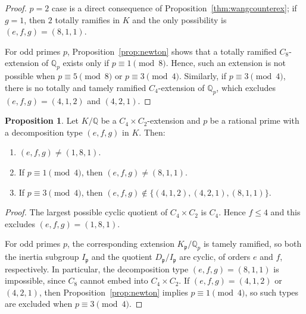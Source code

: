 \documentclass[letterpaper, 10pt]{article}
\newcommand{\bQ}{\mathbb{Q}}
\newcommand{\frp}{\mathfrak{p}}
\newcommand{\1}{\mathds{1}}	%
\theoremstyle{definition}
\newtheorem{proposition}[theorem]{Proposition}
\theoremstyle{remark}
\begin{document}
\begin{proof}


$p = 2$ case is a direct consequence of Proposition~\ref{thm:wangcounterex}; if $g = 1$, then $2$ totally ramifies in $K$ and the only possibility is $(e, f, g) = (8, 1, 1)$.



For odd primes $p$, Proposition~\ref{prop:newton} shows that a totally ramified $C_8$-extension of $\bQ_p$ exists only if $p \equiv 1 \pmod{8}$. Hence, such an extension is not possible when $p \equiv 5 \pmod{8}$ or $p \equiv 3 \pmod{4}$. 
Similarly, if $p \equiv 3 \pmod{4}$, there is no totally and tamely ramified $C_4$-extension of $\bQ_p$, which excludes $(e, f, g) = (4, 1, 2)$ and $(4, 2, 1)$.
\end{proof}

\begin{proposition}
    \label{prop:C4C2ram}
    Let $K / \bQ$ be a $C_4 \times C_2$-extension and $p$ be a rational prime with a decomposition type $(e, f, g)$ in $K$. Then:
    \begin{enumerate}
        \item $(e, f, g) \ne (1, 8, 1)$.
        \item If $p \equiv 1 \pmod{4}$, then $(e, f, g) \ne (8, 1, 1)$.
        \item If $p \equiv 3 \pmod{4}$, then $(e, f, g) \not \in \{(4, 1, 2), (4, 2, 1), (8, 1, 1) \}$.
    \end{enumerate}
\end{proposition}
\begin{proof}

The largest possible cyclic quotient of \( C_4 \times C_2 \) is \( C_4 \). Hence \(f \le 4 \) and this excludes \( (e, f, g) = (1, 8, 1) \).

For odd primes \( p \), the corresponding extension \( K_\frp / \bQ_p \) is tamely ramified, so both the inertia subgroup \( I_\frp \) and the quotient \( D_\frp / I_\frp \) are cyclic, of orders \( e \) and \( f \), respectively. In particular, the decomposition type \( (e, f, g) = (8, 1, 1) \) is impossible, since \( C_8 \) cannot embed into \( C_4 \times C_2 \). If \( (e, f, g) = (4, 1, 2) \) or \( (4, 2, 1) \), then Proposition~\ref{prop:newton} implies \( p \equiv 1 \pmod{4} \), so such types are excluded when \( p \equiv 3 \pmod{4} \).
\end{proof}
\end{document}
